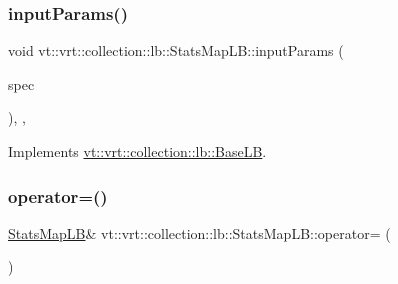 \mbox{\label{structvt_1_1vrt_1_1collection_1_1lb_1_1_stats_map_l_b_a495d91782f11c1bb5d1774a05b2a73f6}} 
\subsubsection{\texorpdfstring{input\+Params()}{inputParams()}}
{\footnotesize\ttfamily void vt\+::vrt\+::collection\+::lb\+::\+Stats\+Map\+L\+B\+::input\+Params (\begin{DoxyParamCaption}\item[{\hyperlink{structvt_1_1vrt_1_1collection_1_1balance_1_1_spec_entry}{balance\+::\+Spec\+Entry} $\ast$}]{spec }\end{DoxyParamCaption})\hspace{0.3cm}{\ttfamily [inline]}, {\ttfamily [override]}, {\ttfamily [virtual]}}



Implements \hyperlink{structvt_1_1vrt_1_1collection_1_1lb_1_1_base_l_b_a555e29aadfd428383464d6dd007506b6}{vt\+::vrt\+::collection\+::lb\+::\+Base\+LB}.

\mbox{\label{structvt_1_1vrt_1_1collection_1_1lb_1_1_stats_map_l_b_a8cf644da07b97637eb00c5384a59ee1e}} 
\subsubsection{\texorpdfstring{operator=()}{operator=()}\hspace{0.1cm}{\footnotesize\ttfamily [1/2]}}
{\footnotesize\ttfamily \hyperlink{structvt_1_1vrt_1_1collection_1_1lb_1_1_stats_map_l_b}{Stats\+Map\+LB}\& vt\+::vrt\+::collection\+::lb\+::\+Stats\+Map\+L\+B\+::operator= (\begin{DoxyParamCaption}\item[{\hyperlink{structvt_1_1vrt_1_1collection_1_1lb_1_1_stats_map_l_b}{Stats\+Map\+LB} const \&}]{ }\end{DoxyParamCaption})\hspace{0.3cm}{\ttfamily [delete]}}

